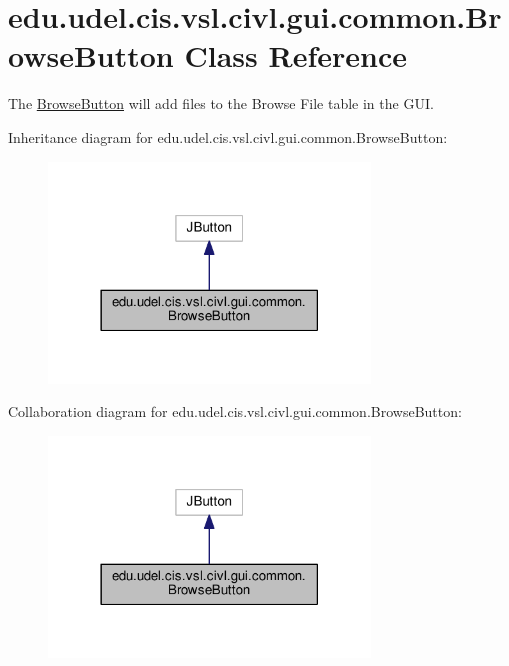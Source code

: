 \hypertarget{classedu_1_1udel_1_1cis_1_1vsl_1_1civl_1_1gui_1_1common_1_1BrowseButton}{}\section{edu.\+udel.\+cis.\+vsl.\+civl.\+gui.\+common.\+Browse\+Button Class Reference}
\label{classedu_1_1udel_1_1cis_1_1vsl_1_1civl_1_1gui_1_1common_1_1BrowseButton}


The \hyperlink{classedu_1_1udel_1_1cis_1_1vsl_1_1civl_1_1gui_1_1common_1_1BrowseButton}{Browse\+Button} will add files to the Browse File table in the G\+U\+I.  




Inheritance diagram for edu.\+udel.\+cis.\+vsl.\+civl.\+gui.\+common.\+Browse\+Button\+:
\nopagebreak
\begin{figure}[H]
\begin{center}
\leavevmode
\includegraphics[width=242pt]{classedu_1_1udel_1_1cis_1_1vsl_1_1civl_1_1gui_1_1common_1_1BrowseButton__inherit__graph}
\end{center}
\end{figure}


Collaboration diagram for edu.\+udel.\+cis.\+vsl.\+civl.\+gui.\+common.\+Browse\+Button\+:
\nopagebreak
\begin{figure}[H]
\begin{center}
\leavevmode
\includegraphics[width=242pt]{classedu_1_1udel_1_1cis_1_1vsl_1_1civl_1_1gui_1_1common_1_1BrowseButton__coll__graph}
\end{center}
\end{figure}
